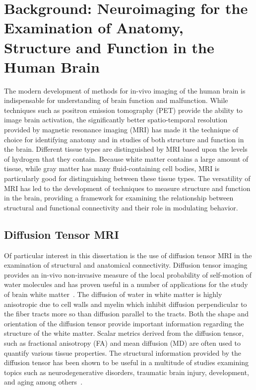 
\chapter{Background: Neuroimaging for the Examination of Anatomy, Structure and Function in the Human Brain }
\label{chap_back}

The modern development of methods for in-vivo imaging of the human brain is indispensable for understanding of brain function and malfunction. While techniques such as positron emission tomography (PET) provide the ability to image brain activation, the significantly better spatio-temporal resolution provided by magnetic resonance imaging (MRI) has made it the technique of choice for identifying anatomy and in studies of both structure and function in the brain. Different tissue types are distinguished by MRI based upon the levels of hydrogen that they contain. Because white matter contains a large amount of tissue, while gray matter has many fluid-containing cell bodies, MRI is particularly good for distinguishing between these tissue types. The versatility of MRI has led to the development of techniques to measure structure and function in the brain, providing a framework for examining the relationship between structural and functional connectivity and their role in modulating behavior.

\section{Diffusion Tensor MRI}
Of particular interest in this dissertation is the use of diffusion tensor MRI in the examination of structural and anatomical connectivity. Diffusion tensor imaging provides an in-vivo non-invasive measure of the local probability of self-motion of water molecules and has proven useful in a number of applications for the study of brain white matter~\cite{Basser1994}. The diffusion of water in white matter is highly anisotropic due to cell walls and myelin which inhibit diffusion perpendicular to the fiber tracts more so than diffusion parallel to the tracts. Both the shape and orientation of the diffusion tensor provide important information regarding the structure of the white matter. Scalar metrics derived from the diffusion tensor, such as fractional anisotropy (FA) and mean diffusion (MD) are often used to quantify various tissue properties. The structural information provided by the diffusion tensor has been shown to be useful in a multitude of studies examining topics such as neurodegenerative disorders, traumatic brain injury, development, and aging among others~\cite{Lebel2008,Sydykova2007,Xu2007}.


